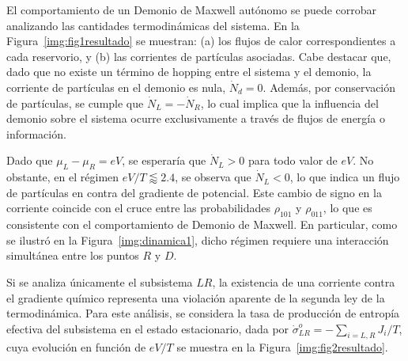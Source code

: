 
El comportamiento de un Demonio de Maxwell autónomo se puede corrobar analizando las cantidades termodinámicas del sistema. En la Figura~\ref{img:fig1resultado} se muestran: (a) los flujos de calor correspondientes a cada reservorio, y (b) las corrientes de partículas asociadas. Cabe destacar que, dado que no existe un término de hopping entre el sistema y el demonio, la corriente de partículas en el demonio es nula, $\dot{N}_{d} = 0$. Además, por conservación de partículas, se cumple que $\dot{N}_{L} = -\dot{N}_{R}$, lo cual implica que la influencia del demonio sobre el sistema ocurre exclusivamente a través de flujos de energía o información.

Dado que $\mu_L - \mu_R = eV$, se esperaría que $\dot{N}_L > 0$ para todo valor de $eV$. No obstante, en el régimen $eV/T \lessapprox 2.4$, se observa que $\dot{N}_L < 0$, lo que indica un flujo de partículas en contra del gradiente de potencial. Este cambio de signo en la corriente coincide con el cruce entre las probabilidades $\rho_{101}$ y $\rho_{011}$, lo que es consistente con el comportamiento de Demonio de Maxwell. En particular, como se ilustró en la Figura~\ref{img:dinamica1}, dicho régimen requiere una interacción simultánea entre los puntos $R$ y $D$.

Si se analiza únicamente el subsistema $LR$, la existencia de una corriente contra el gradiente químico representa una violación aparente de la segunda ley de la termodinámica. Para este análisis, se considera la tasa de producción de entropía efectiva del subsistema en el estado estacionario, dada por $\dot{\sigma}^{o}_{LR} = - \sum_{i=L,R} J_i/T$, cuya evolución en función de $eV/T$ se muestra en la Figura~\ref{img:fig2resultado}.



